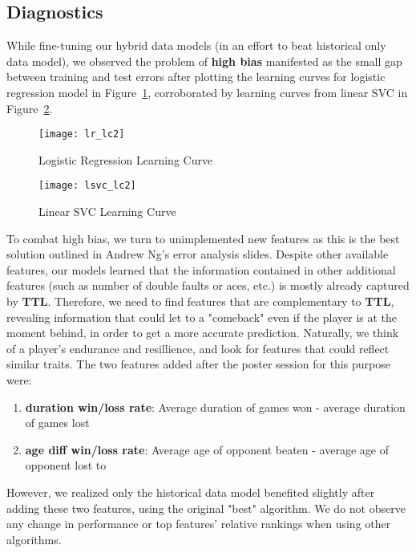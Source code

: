 \documentclass[paper=a4, fontsize=10pt]{scrartcl} %
\numberwithin{equation}{section} %
\numberwithin{figure}{section} %
\numberwithin{table}{section} %
\begin{document}
\subsection{Diagnostics}
While fine-tuning our hybrid data models (in an effort to beat historical only data model), we observed the problem of \textbf{high bias} manifested as the small gap between training and test errors after plotting the learning curves for logistic regression model in Figure~\ref{fig:lg}, corroborated by learning curves from linear SVC in Figure~\ref{fig:lsvc}. 
\begin{figure}[h]
\caption{Logistic Regression Learning Curve}
  \label{fig:lg}
  \centering
    \texttt{[image: lr\_lc2]}
\end{figure}

\begin{figure}[h]
\caption{Linear SVC Learning Curve}
  \label{fig:lsvc}
  \centering
    \texttt{[image: lsvc\_lc2]}
\end{figure}

To combat high bias, we turn to unimplemented new features as this is the best solution outlined in Andrew Ng's error analysis slides. Despite other available features, our models learned that the information contained in other additional features (such as number of double faults or aces, etc.) is mostly already captured by \textbf{TTL}.  Therefore, we need to find features that are complementary to \textbf{TTL}, revealing information that could let to a "comeback" even if the player is at the moment behind, in order to get a more accurate prediction. Naturally, we think of a player's endurance and resillience, and look for features that could reflect similar traits. The two features added after the poster session for this purpose were: \begin{enumerate}
\item \textbf{duration win/loss rate}: Average duration of games won - average duration of games lost
\item \textbf{age diff win/loss rate}: Average age of opponent beaten - average age of opponent lost to
\end{enumerate}

However, we realized only the historical data model benefited slightly after adding these two features, using the original "best" algorithm. We do not observe any change in performance or top features' relative rankings when using other algorithms.
\end{document}
